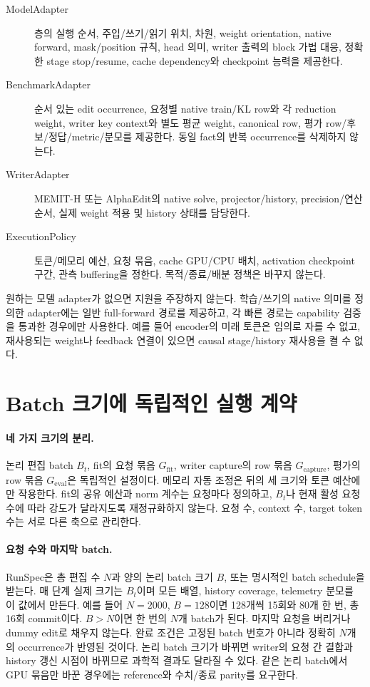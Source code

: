 \documentclass[11pt]{article}
\begin{document}
\begin{description}
\item[ModelAdapter] 층의 실행 순서, 주입/쓰기/읽기 위치, 차원, weight orientation,
native forward, mask/position 규칙, head 의미, writer 출력의 block 가법 대응,
정확한 stage stop/resume, cache dependency와 checkpoint 능력을 제공한다.
\item[BenchmarkAdapter] 순서 있는 edit occurrence, 요청별 native train/KL row와
각 reduction weight, writer key context와 별도 평균 weight, canonical row,
평가 row/후보/정답/metric/분모를 제공한다. 동일 fact의 반복 occurrence를 삭제하지 않는다.
\item[WriterAdapter] MEMIT-H 또는 AlphaEdit의 native solve, projector/history,
precision/연산 순서, 실제 weight 적용 및 history 상태를 담당한다.
\item[ExecutionPolicy] 토큰/메모리 예산, 요청 묶음, cache GPU/CPU 배치,
activation checkpoint 구간, 관측 buffering을 정한다. 목적/종료/배분 정책은 바꾸지 않는다.
\end{description}

원하는 모델 adapter가 없으면 지원을 주장하지 않는다. 학습/쓰기의 native 의미를
정의한 adapter에는 일반 full-forward 경로를 제공하고, 각 빠른 경로는 capability
검증을 통과한 경우에만 사용한다. 예를 들어 encoder의 미래 토큰은 임의로 자를 수 없고,
재사용되는 weight나 feedback 연결이 있으면 causal stage/history 재사용을 켤 수 없다.

\section{Batch 크기에 독립적인 실행 계약}
\paragraph{네 가지 크기의 분리.}
논리 편집 batch $B_t$, fit의 요청 묶음 $G_{\mathrm{fit}}$,
writer capture의 row 묶음 $G_{\mathrm{capture}}$, 평가의 row 묶음
$G_{\mathrm{eval}}$은 독립적인 설정이다. 메모리 자동 조정은 뒤의 세 크기와
토큰 예산에만 작용한다. fit의 공유 예산과 norm 계수는 요청마다 정의하고,
$B_t$나 현재 활성 요청 수에 따라 강도가 달라지도록 재정규화하지 않는다.
요청 수, context 수, target token 수는 서로 다른 축으로 관리한다.

\paragraph{요청 수와 마지막 batch.}
RunSpec은 총 편집 수 $N$과 양의 논리 batch 크기 $B$, 또는 명시적인
batch schedule을 받는다. 매 단계 실제 크기는 $B_t$이며 모든 배열, history
coverage, telemetry 분모를 이 값에서 만든다. 예를 들어 $N=2000$, $B=128$이면
128개씩 15회와 80개 한 번, 총 16회 commit이다. $B>N$이면 한 번의 $N$개
batch가 된다. 마지막 요청을 버리거나 dummy edit로 채우지 않는다.
완료 조건은 고정된 batch 번호가 아니라 정확히 $N$개의 occurrence가 반영된 것이다.
논리 batch 크기가 바뀌면 writer의 요청 간 결합과 history 갱신 시점이 바뀌므로
과학적 결과도 달라질 수 있다. 같은 논리 batch에서 GPU 묶음만 바꾼 경우에는
reference와 수치/종료 parity를 요구한다.
\end{document}
